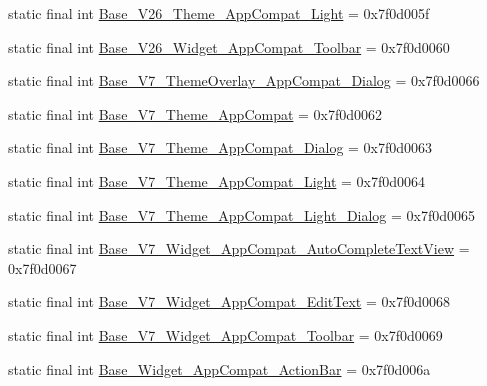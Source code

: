 \begin{DoxyCompactItemize}
\item 
static final int \mbox{\hyperlink{classandroid_1_1support_1_1v7_1_1appcompat_1_1_r_1_1style_a86627c51c210088bc5dc98055d76e959}{Base\+\_\+\+V26\+\_\+\+Theme\+\_\+\+App\+Compat\+\_\+\+Light}} = 0x7f0d005f
\item 
static final int \mbox{\hyperlink{classandroid_1_1support_1_1v7_1_1appcompat_1_1_r_1_1style_a0a6f72301d58995b809570a0a7012f42}{Base\+\_\+\+V26\+\_\+\+Widget\+\_\+\+App\+Compat\+\_\+\+Toolbar}} = 0x7f0d0060
\item 
static final int \mbox{\hyperlink{classandroid_1_1support_1_1v7_1_1appcompat_1_1_r_1_1style_aa289bd63117308a21c969dc70fad616e}{Base\+\_\+\+V7\+\_\+\+Theme\+Overlay\+\_\+\+App\+Compat\+\_\+\+Dialog}} = 0x7f0d0066
\item 
static final int \mbox{\hyperlink{classandroid_1_1support_1_1v7_1_1appcompat_1_1_r_1_1style_af7bbf205eddb9f8c00176de5b1e9f819}{Base\+\_\+\+V7\+\_\+\+Theme\+\_\+\+App\+Compat}} = 0x7f0d0062
\item 
static final int \mbox{\hyperlink{classandroid_1_1support_1_1v7_1_1appcompat_1_1_r_1_1style_ac7263441f275d66e68fdf170d1031abe}{Base\+\_\+\+V7\+\_\+\+Theme\+\_\+\+App\+Compat\+\_\+\+Dialog}} = 0x7f0d0063
\item 
static final int \mbox{\hyperlink{classandroid_1_1support_1_1v7_1_1appcompat_1_1_r_1_1style_a447ddfdca58adb0c8720b9efcd480886}{Base\+\_\+\+V7\+\_\+\+Theme\+\_\+\+App\+Compat\+\_\+\+Light}} = 0x7f0d0064
\item 
static final int \mbox{\hyperlink{classandroid_1_1support_1_1v7_1_1appcompat_1_1_r_1_1style_a08bfd257261eced92485a6a577209bcf}{Base\+\_\+\+V7\+\_\+\+Theme\+\_\+\+App\+Compat\+\_\+\+Light\+\_\+\+Dialog}} = 0x7f0d0065
\item 
static final int \mbox{\hyperlink{classandroid_1_1support_1_1v7_1_1appcompat_1_1_r_1_1style_a341274b28a1791a4d4de468f2937e268}{Base\+\_\+\+V7\+\_\+\+Widget\+\_\+\+App\+Compat\+\_\+\+Auto\+Complete\+Text\+View}} = 0x7f0d0067
\item 
static final int \mbox{\hyperlink{classandroid_1_1support_1_1v7_1_1appcompat_1_1_r_1_1style_ae17c6169562b437797c8ae9b247ef322}{Base\+\_\+\+V7\+\_\+\+Widget\+\_\+\+App\+Compat\+\_\+\+Edit\+Text}} = 0x7f0d0068
\item 
static final int \mbox{\hyperlink{classandroid_1_1support_1_1v7_1_1appcompat_1_1_r_1_1style_a4d27eb93a5dd0384a99f8d4a3432d5d9}{Base\+\_\+\+V7\+\_\+\+Widget\+\_\+\+App\+Compat\+\_\+\+Toolbar}} = 0x7f0d0069
\item 
static final int \mbox{\hyperlink{classandroid_1_1support_1_1v7_1_1appcompat_1_1_r_1_1style_a0bf1f7f1e1772ee2c55dc270ab6c9c13}{Base\+\_\+\+Widget\+\_\+\+App\+Compat\+\_\+\+Action\+Bar}} = 0x7f0d006a

\end{DoxyCompactItemize}
